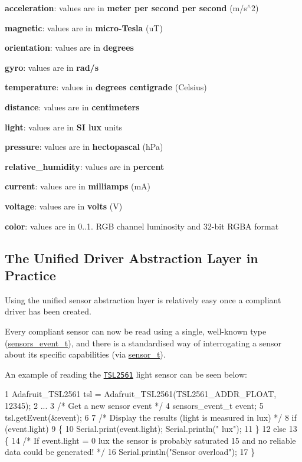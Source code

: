 \begin{DoxyItemize}
\item {\bfseries acceleration}\+: values are in {\bfseries meter per second per second} (m/s$^\wedge$2)
\item {\bfseries magnetic}\+: values are in {\bfseries micro-\/\+Tesla} (uT)
\item {\bfseries orientation}\+: values are in {\bfseries degrees}
\item {\bfseries gyro}\+: values are in {\bfseries rad/s}
\item {\bfseries temperature}\+: values in {\bfseries degrees centigrade} (Celsius)
\item {\bfseries distance}\+: values are in {\bfseries centimeters}
\item {\bfseries light}\+: values are in {\bfseries SI lux} units
\item {\bfseries pressure}\+: values are in {\bfseries hectopascal} (h\+Pa)
\item {\bfseries relative\+\_\+humidity}\+: values are in {\bfseries percent}
\item {\bfseries current}\+: values are in {\bfseries milliamps} (mA)
\item {\bfseries voltage}\+: values are in {\bfseries volts} (V)
\item {\bfseries color}\+: values are in 0..1. R\+GB channel luminosity and 32-\/bit R\+G\+BA format
\end{DoxyItemize}

\subsection*{The Unified Driver Abstraction Layer in Practice}

Using the unified sensor abstraction layer is relatively easy once a compliant driver has been created.

Every compliant sensor can now be read using a single, well-\/known \textquotesingle{}type\textquotesingle{} (\hyperlink{_adafruit___sensor_8h_structsensors__event__t}{sensors\+\_\+event\+\_\+t}), and there is a standardised way of interrogating a sensor about its specific capabilities (via \hyperlink{_adafruit___sensor_8h_structsensor__t}{sensor\+\_\+t}).

An example of reading the \href{https://github.com/adafruit/Adafruit_TSL2561}{\tt T\+S\+L2561} light sensor can be seen below\+:


\begin{DoxyCode}
1 Adafruit\_TSL2561 tsl = Adafruit\_TSL2561(TSL2561\_ADDR\_FLOAT, 12345);
2 ...
3 /* Get a new sensor event */ 
4 sensors\_event\_t event;
5 tsl.getEvent(&event);
6 
7 /* Display the results (light is measured in lux) */
8 if (event.light)
9 \{
10   Serial.print(event.light); Serial.println(" lux");
11 \}
12 else
13 \{
14   /* If event.light = 0 lux the sensor is probably saturated
15      and no reliable data could be generated! */
16   Serial.println("Sensor overload");
17 \}
\end{DoxyCode}


